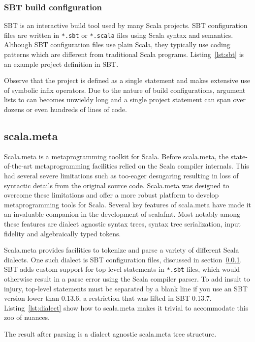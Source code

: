 \subsubsection{SBT build configuration}\label{sec:sbt}
SBT\autocite{_sbt_????} is an interactive build tool used by many Scala projects.
SBT configuration files are written in \texttt{*.sbt} or \texttt{*.scala} files using Scala syntax and semantics.
Although SBT configuration files use plain Scala, they typically use coding patterns which are different from traditional Scala programs.
Listing~\ref{lst:sbt} is an example project definition in SBT.

Observe that the project is defined as a single statement and makes extensive use of symbolic infix operators.
Due to the nature of build configurations, argument lists to can becomes unwieldy long and a single project statement can span over dozens or even hundreds of lines of code.


\subsection{scala.meta}
Scala.meta\autocite{scala57:online} is a metaprogramming toolkit for Scala.
Before scala.meta, the state-of-the-art metaprogramming facilities relied on the Scala compiler internals.
This had several severe limitations such as too-eager desugaring resulting in loss of syntactic details from the original source code.
Scala.meta was designed to overcome these limitations and offer a more robust platform to develop metaprogramming tools for Scala.
Several key features of scala.meta have made it an invaluable companion in the development of scalafmt.
Most notably among these features are dialect agnostic syntax trees, syntax tree serialization, input fidelity and algebraically typed tokens.

Scala.meta provides facilities to tokenize and parse a variety of different Scala dialects.
One such dialect is SBT configuration files, discussed in section~\ref{sec:sbt}.
SBT adds custom support for top-level statements in \texttt{*.sbt} files, which would otherwise result in a parse error using the Scala compiler parser.
To add insult to injury, top-level statements must be separated by a blank line if you use an SBT version lower than 0.13.6; a restriction that was lifted in SBT 0.13.7.
Listing~\ref{lst:dialect} show how to scala.meta makes it trivial to accommodate this zoo of nuances.

The result after parsing is a dialect agnostic scala.meta tree structure.

